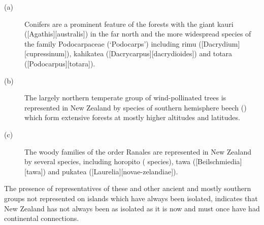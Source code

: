 \begin{description}
\item[{(a)}]Conifers are a prominent feature of the forests with the giant kauri ([Agathis][australis]) in the far north and the more widespread species of the family Podocarpaceae (`Podocarps') including rimu ([Dacrydium][cupressinum]), kahikatea ([Dacrycarpus][dacrydioides]) and totara ([Podocarpus][totara]).
\item[{(b)}]The largely northern temperate group of wind-pollinated trees is represented in New Zealand by species of southern hemisphere beech () which form extensive forests at mostly higher altitudes and latitudes.
\item[{(c)}]The woody families of the order Ranales are represented in New Zealand by several species, including horopito ( species), tawa ([Beilschmiedia][tawa]) and pukatea ([Laurelia][novae-zelandiae]).
\end{description}

The presence of representatives of these and other ancient and mostly southern groups not represented on islands which have always been isolated, indicates that New Zealand has not always been as isolated as it is now and must once have had continental connections.

